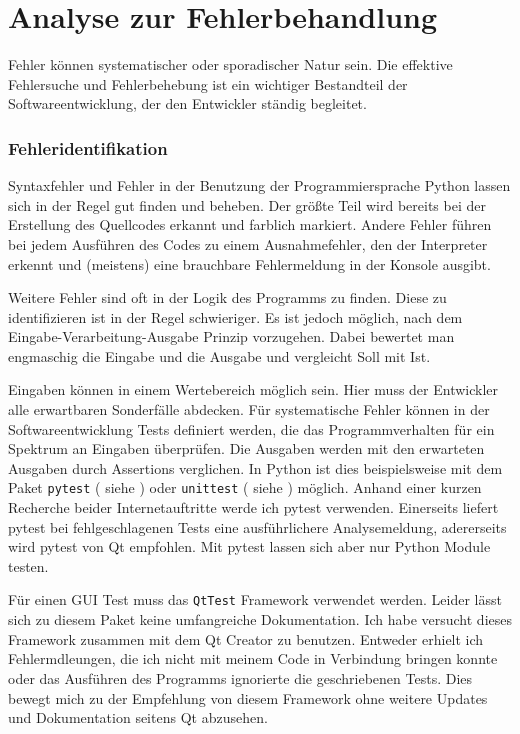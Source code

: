 \chapter{Analyse zur Fehlerbehandlung}\label{Fehlerbehandlung}

Fehler können systematischer oder sporadischer Natur sein.
Die effektive Fehlersuche und Fehlerbehebung ist ein wichtiger Bestandteil der Softwareentwicklung, der den Entwickler 
ständig begleitet. 

\subsection{Fehleridentifikation}

Syntaxfehler und Fehler in der Benutzung der Programmiersprache Python lassen sich in der Regel gut finden und beheben.
Der größte Teil wird bereits bei der Erstellung des Quellcodes erkannt und farblich markiert. 
Andere Fehler führen bei jedem Ausführen des Codes zu einem Ausnahmefehler, den der Interpreter erkennt und (meistens) eine brauchbare
Fehlermeldung in der Konsole ausgibt. 

Weitere Fehler sind oft in der Logik des Programms zu finden. Diese zu identifizieren ist in der Regel schwieriger.
Es ist jedoch möglich, nach dem Eingabe-Verarbeitung-Ausgabe Prinzip vorzugehen. 
Dabei bewertet man engmaschig die Eingabe und die Ausgabe und vergleicht Soll mit Ist. 

Eingaben können in einem Wertebereich möglich sein.
Hier muss der Entwickler alle erwartbaren Sonderfälle abdecken.
Für systematische Fehler können in der Softwareentwicklung Tests definiert werden, die das Programmverhalten 
für ein Spektrum an Eingaben überprüfen.
Die Ausgaben werden mit den erwarteten Ausgaben durch Assertions verglichen.
In Python ist dies beispielsweise mit dem Paket \verb|pytest| ( siehe \cite{pytestHP}) oder \verb|unittest| ( siehe \cite{unittestHP}) möglich.
Anhand einer kurzen Recherche beider Internetauftritte werde ich pytest verwenden.
Einerseits liefert pytest bei fehlgeschlagenen Tests eine ausführlichere Analysemeldung, adererseits wird pytest von Qt empfohlen.
Mit pytest lassen sich aber nur Python Module testen.

Für einen GUI Test muss das \verb|QtTest| Framework verwendet werden.
Leider lässt sich zu diesem Paket keine umfangreiche Dokumentation. 
Ich habe versucht dieses Framework zusammen mit dem Qt Creator zu benutzen. 
Entweder erhielt ich Fehlermdleungen, die ich nicht mit meinem Code in Verbindung bringen konnte 
oder das Ausführen des Programms ignorierte die geschriebenen Tests.
Dies bewegt mich zu der Empfehlung von diesem Framework ohne weitere Updates und Dokumentation seitens Qt abzusehen.

